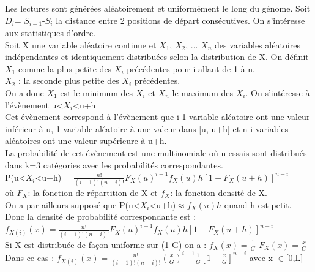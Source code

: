 \documentclass[11pt,a4paper]{article} %
\begin{document}
Les lectures sont générées aléatoirement et uniformément le long du génome.
Soit $D_{i}$= $S_{i+1}$-$S_{i}$ la distance entre 2 positions de départ consécutives.
On s'intéresse aux statistiques d'ordre.\\
Soit X une variable aléatoire continue et $X_{1}$, $X_{2}$, ... $X_{n}$ des variables aléatoires indépendantes et identiquement distribuées selon la distribution de X.
On définit $X_{1}$ comme la plus petite des $X_{i}$ précédentes pour i allant de 1 à n.\\
$X_{2}$ : la seconde plus petite des $X_{i}$ précédentes.\\
On a donc $X_{1}$ est le minimum des $X_{i}$ et $X_{n}$ le maximum des $X_{i}$.
On s'intéresse à l'évènement u<$X_{i}$<u+h\\
Cet évènement correspond à l'évènement que i-1 variable aléatoire ont une valeur inférieur à u, 1 variable aléatoire à une valeur dans [u, u+h] et n-i variables aléatoires ont une valeur supérieure à u+h.\\
La probabilité de cet évènement est une multinomiale où n essais sont distribués dans k=3 catégories avec les probabilités correspondantes.\\
P(u<$X_{i}$<u+h) = $\frac{n!}{(i-1)!(n-i)!} F_X(u)^{i-1}f_X(u)h[1-F_X(u+h)]^{n-i}$\\
où $F_X $: la fonction de répartition de X
et $f_X $: la fonction densité de X.\\
On a par ailleurs supposé que P(u<$X_{i}$<u+h)$\approx f_X(u)h$ quand h est petit.
Donc la densité de probabilité correspondante est :\\
$f_{X(i)}(x) = \frac{n!}{(i-1)!(n-i)!} F_X(u)^{i-1}f_X(u)h[1-F_X(u+h)]^{n-i}$\\
Si X est distribuée de façon uniforme sur (1-G) on a :
$f_X(x)=\frac{1}{G}$  $F_X(x)=\frac{x}{G}$\\
Dans ce cas : 
$f_{X(i)}(x) = \frac{n!}{(i-1)!(n-i)!} (\frac{x}{G})^{i-1} \frac{1}{G} [1-\frac{x}{G}]^{n-i}$ avec x $ \in $[0,L]                                                                                                                                                                                                                                                                                                                                                                                                                                                                                                                                                                                                                                                       
\end{document}
